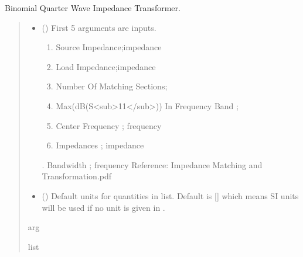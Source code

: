 \documentclass[letterpaper,10pt,english]{sphinxmanual}
\begin{document}

\begin{fulllineitems}
\label{\detokenize{components:components.Binomial_QWave_Impedance_Transformer}}
\pysigstartsignatures
{}
\pysigstopsignatures
\sphinxAtStartPar
Binomial Quarter Wave Impedance Transformer.
\begin{quote}\begin{description}
\begin{itemize}
\item {}
\sphinxAtStartPar
{} () \textendash{}
\sphinxAtStartPar
First 5 arguments are inputs.
\begin{enumerate}
%
\item {}
\sphinxAtStartPar
Source Impedance;impedance

\item {}
\sphinxAtStartPar
Load Impedance;impedance

\item {}
\sphinxAtStartPar
Number Of Matching Sections;

\item {}
\sphinxAtStartPar
Max(dB(S\textless{}sub\textgreater{}11\textless{}/sub\textgreater{})) In Frequency Band ;

\item {}
\sphinxAtStartPar
Center Frequency ; frequency

\item {}
\sphinxAtStartPar
Impedances ; impedance

\end{enumerate}

.  Bandwidth ; frequency
Reference:  Impedance Matching and Transformation.pdf


\item {}
\sphinxAtStartPar
{} (\sphinxstyleliteralemphasis{\sphinxupquote{, }}) \textendash{} Default units for quantities in  list. Default is {[}{]} which means SI units will be used if no unit is given in .

\end{itemize}

\sphinxAtStartPar
arg

\sphinxAtStartPar
list

\end{description}\end{quote}

\end{fulllineitems}
\end{document}
